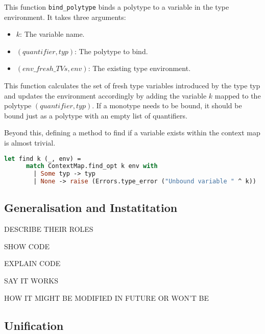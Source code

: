 \documentclass{l4proj}
\begin{document}
This function \texttt{bind\_polytype} binds a polytype to a variable in the type environment.
It takes three arguments:
\begin{itemize}
    \item $k$: The variable name.
    \item $(quantifier, typ)$: The polytype to bind.
    \item $(env\_fresh\_TVs, env)$: The existing type environment.
\end{itemize}

This function calculates the set of fresh type variables introduced by the type typ and updates the environment accordingly by adding the variable $k$ mapped to the polytype $(quantifier, typ)$.
If a monotype needs to be bound, it should be bound just as a polytype with an empty list of quantifiers.

Beyond this, defining a method to find if a variable exists within the context map is almost trivial.

\begin{lstlisting}[language=Caml]
    let find k (_, env) = 
      match ContextMap.find_opt k env with
        | Some typ -> typ
        | None -> raise (Errors.type_error ("Unbound variable " ^ k))
\end{lstlisting}

\subsection{Generalisation and Instatitation}

DESCRIBE THEIR ROLES

SHOW CODE

EXPLAIN CODE

SAY IT WORKS

HOW IT MIGHT BE MODIFIED IN FUTURE OR WON'T BE

\subsection{Unification}
\end{document}
